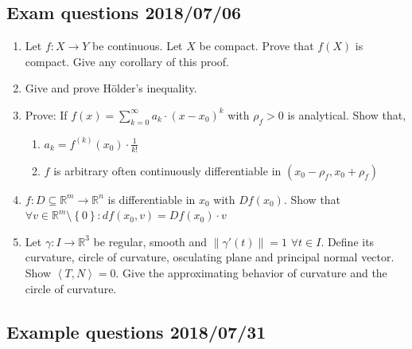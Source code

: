 \documentclass{article}
\newcommand{\set}[1]{\left\{#1\right\}}
\newcommand{\angel}[1]{\left\langle#1\right\rangle}
\newcommand{\norm}[1]{\left\|#1\right\|}
\begin{document}
\subsection*{Exam questions 2018/07/06}

\begin{enumerate}
  \item Let $f: X \to Y$ be continuous. Let $X$ be compact. Prove that $f(X)$ is compact. Give any corollary of this proof.
  \item Give and prove H\"older's inequality.
  \item Prove: If $f(x) = \sum_{k=0}^\infty a_k \cdot (x - x_0)^k$ with $\rho_f > 0$ is analytical.
    Show that,
    \begin{enumerate}
      \item $a_k = f^{(k)}(x_0) \cdot \frac{1}{k!}$
      \item $f$ is arbitrary often continuously differentiable in $(x_0 - \rho_f, x_0 + \rho_f)$
    \end{enumerate}
  \item $f: D \subseteq \mathbb R^m \to \mathbb R^n$ is differentiable in $x_0$ with $Df(x_0)$. Show that $\forall v \in \mathbb R^m \setminus \set{0}: df(x_0, v) = Df(x_0) \cdot v$
  \item Let $\gamma: I \to \mathbb R^3$ be regular, smooth and $\norm{\gamma'(t)} = 1$ $\forall t \in I$. Define its curvature, circle of curvature, osculating plane and principal normal vector. Show $\angel{T, N} = 0$. Give the approximating behavior of curvature and the circle of curvature.
\end{enumerate}

\subsection*{Example questions 2018/07/31}
\end{document}
